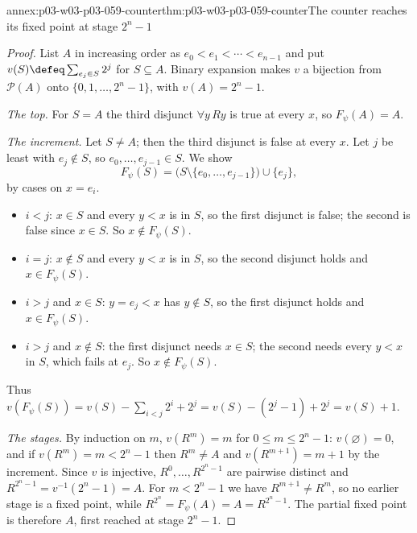 \begin{annexitem}{annex:p03-w03-p03-059-counter}{thm:p03-w03-p03-059-counter}{The counter reaches its fixed point at stage \(2^n-1\)}
\begin{proof}
List \(A\) in increasing order as \(e_0<e_1<\cdots<e_{n-1}\) and put
\(v(S)\defeq\sum_{e_j\in S}2^j\) for \(S\subseteq A\). Binary expansion
makes \(v\) a bijection from \(\mathcal P(A)\) onto
\(\{0,1,\ldots,2^n-1\}\), with \(v(A)=2^n-1\).

\emph{The top.} For \(S=A\) the third disjunct \(\forall y\,Ry\) is true at
every \(x\), so \(F_\psi(A)=A\).

\emph{The increment.} Let \(S\neq A\); then the third disjunct is false at
every \(x\). Let \(j\) be least with \(e_j\notin S\), so
\(e_0,\ldots,e_{j-1}\in S\). We show
\[
 F_\psi(S)=\bigl(S\setminus\{e_0,\ldots,e_{j-1}\}\bigr)\cup\{e_j\},
\]
by cases on \(x=e_i\).
\begin{itemize}
 \item \(i<j\): \(x\in S\) and every \(y<x\) is in \(S\), so the first
       disjunct is false; the second is false since \(x\in S\). So
       \(x\notin F_\psi(S)\).
 \item \(i=j\): \(x\notin S\) and every \(y<x\) is in \(S\), so the second
       disjunct holds and \(x\in F_\psi(S)\).
 \item \(i>j\) and \(x\in S\): \(y=e_j<x\) has \(y\notin S\), so the first
       disjunct holds and \(x\in F_\psi(S)\).
 \item \(i>j\) and \(x\notin S\): the first disjunct needs \(x\in S\); the
       second needs every \(y<x\) in \(S\), which fails at \(e_j\). So
       \(x\notin F_\psi(S)\).
\end{itemize}
Thus \(v(F_\psi(S))=v(S)-\sum_{i<j}2^i+2^j=v(S)-(2^j-1)+2^j=v(S)+1\).

\emph{The stages.} By induction on \(m\), \(v(R^m)=m\) for
\(0\leq m\leq2^n-1\): \(v(\varnothing)=0\), and if \(v(R^m)=m<2^n-1\) then
\(R^m\neq A\) and \(v(R^{m+1})=m+1\) by the increment. Since \(v\) is
injective, \(R^0,\ldots,R^{2^n-1}\) are pairwise distinct and
\(R^{2^n-1}=v^{-1}(2^n-1)=A\). For \(m<2^n-1\) we have
\(R^{m+1}\neq R^m\), so no earlier stage is a fixed point, while
\(R^{2^n}=F_\psi(A)=A=R^{2^n-1}\). The partial fixed point is therefore
\(A\), first reached at stage \(2^n-1\).
\end{proof}
\end{annexitem}

